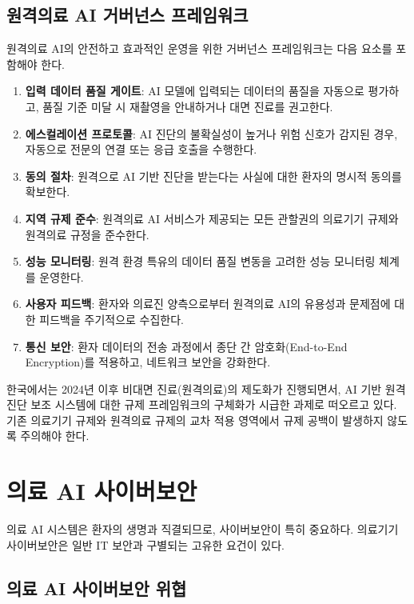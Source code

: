 \subsection{원격의료 AI 거버넌스 프레임워크}

원격의료 AI의 안전하고 효과적인 운영을 위한 거버넌스 프레임워크는 다음 요소를 포함해야 한다.

\begin{enumerate}
 \item \textbf{입력 데이터 품질 게이트}: AI 모델에 입력되는 데이터의 품질을 자동으로 평가하고, 품질 기준 미달 시 재촬영을 안내하거나 대면 진료를 권고한다.
 \item \textbf{에스컬레이션 프로토콜}: AI 진단의 불확실성이 높거나 위험 신호가 감지된 경우, 자동으로 전문의 연결 또는 응급 호출을 수행한다.
 \item \textbf{동의 절차}: 원격으로 AI 기반 진단을 받는다는 사실에 대한 환자의 명시적 동의를 확보한다.
 \item \textbf{지역 규제 준수}: 원격의료 AI 서비스가 제공되는 모든 관할권의 의료기기 규제와 원격의료 규정을 준수한다.
 \item \textbf{성능 모니터링}: 원격 환경 특유의 데이터 품질 변동을 고려한 성능 모니터링 체계를 운영한다.
 \item \textbf{사용자 피드백}: 환자와 의료진 양측으로부터 원격의료 AI의 유용성과 문제점에 대한 피드백을 주기적으로 수집한다.
 \item \textbf{통신 보안}: 환자 데이터의 전송 과정에서 종단 간 암호화(End-to-End Encryption)를 적용하고, 네트워크 보안을 강화한다.
\end{enumerate}

한국에서는 2024년 이후 비대면 진료(원격의료)의 제도화가 진행되면서, AI 기반 원격 진단 보조 시스템에 대한 규제 프레임워크의 구체화가 시급한 과제로 떠오르고 있다. 기존 의료기기 규제와 원격의료 규제의 교차 적용 영역에서 규제 공백이 발생하지 않도록 주의해야 한다.

\section{의료 AI 사이버보안}
\label{sec:16.4.5}

의료 AI 시스템은 환자의 생명과 직결되므로, 사이버보안이 특히 중요하다. 의료기기 사이버보안은 일반 IT 보안과 구별되는 고유한 요건이 있다.

\subsection{의료 AI 사이버보안 위협}


